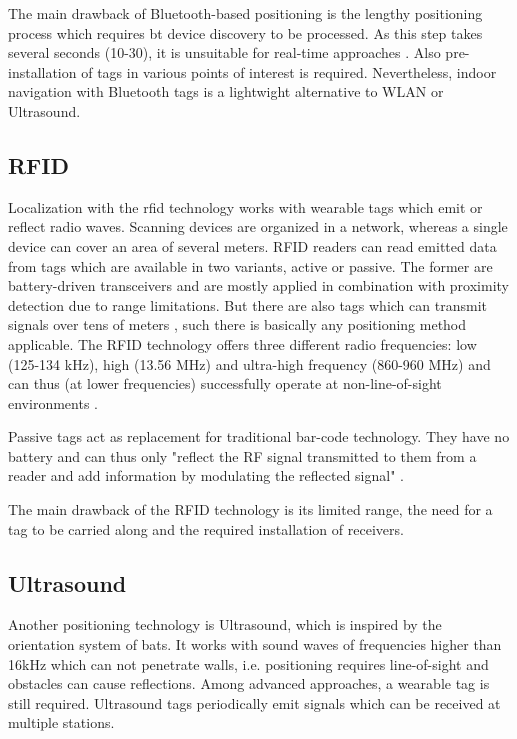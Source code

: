 The main drawback of Bluetooth-based positioning is the lengthy positioning process which requires \ac{bt} device discovery to be processed. As this step takes several seconds (10-30), it is unsuitable for real-time approaches \cite{recentAdvances}. Also pre-installation of tags in various points of interest is required. Nevertheless, indoor navigation with Bluetooth tags is a lightwight alternative to WLAN or Ultrasound.

\subsection*{RFID}
Localization with the \ac{rfid} technology works with wearable tags which emit or reflect radio waves. Scanning devices are organized in a network, whereas a single device can cover an area of several meters. RFID readers can read emitted data from tags which are available in two variants, active or passive. The former are battery-driven transceivers and are mostly applied in combination with proximity detection due to range limitations. But there are also tags which can transmit signals over tens of meters \cite{surveyWirelessIPS}, such there is basically any positioning method applicable. 
The RFID technology offers three different radio frequencies: low (125-134 kHz), high (13.56 MHz) and ultra-high frequency (860-960 MHz) and can thus (at lower frequencies) successfully operate at non-line-of-sight environments \cite{wirelessILSystemsAndTechniques}.

Passive tags act as replacement for traditional bar-code technology. They have no battery and can thus only "reflect the RF signal transmitted to them from a reader and add information by modulating the reflected signal" \cite{surveyWirelessIPS}.

The main drawback of the RFID technology is its limited range, the need for a tag to be carried along and the required installation of receivers.

\subsection*{Ultrasound}
Another positioning technology is Ultrasound, which is inspired by the orientation system of bats. It works with sound waves of frequencies higher than 16kHz which can not penetrate walls, i.e. positioning requires line-of-sight and obstacles can cause reflections.
Among advanced approaches, a wearable tag is still required. Ultrasound tags periodically emit signals which can be received at multiple stations.

